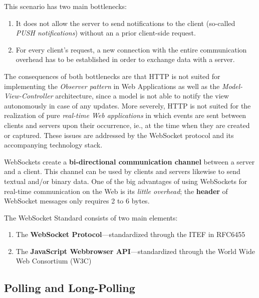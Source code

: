\documentclass[a4paper, justified, notoc]{tufte-handout} %
\begin{document}
This scenario has two main bottlenecks:
\begin{enumerate}
	\item It does not allow the server to send notifications to the client (so-called \emph{PUSH notifications}) without an a prior client-side request.
	\item For every client's request, a new connection with the entire communication overhead has to be established in order to exchange data with a server.
\end{enumerate}

The consequences of both bottlenecks are that HTTP is not suited for implementing the \emph{Observer pattern} in Web Applications as well as the \emph{Model-View-Controller} architecture, since a model is not able to notify the view autonomously in case of any updates. More severely, HTTP is not suited for the realization of pure \emph{real-time Web applications} in which events are sent between clients and servers upon their occurrence, ie., at the time when they are created or captured. 
These issues are addressed by the WebSocket protocol and its accompanying technology stack.

WebSockets create a \textbf{bi-directional communication channel} between a server and a client. This channel can be used by clients and servers likewise to send textual and/or binary data. 
One of the big advantages of using WebSockets for real-time communication on the Web is its \emph{little overhead}; the \textbf{header} of WebSocket messages only requires 2 to 6 bytes. 

The WebSocket Standard consists of two main elements:
\begin{enumerate}
	\item The \textbf{WebSocket Protocol}---standardized through the ITEF in RFC6455
	\item The \textbf{JavaScript Webbrowser API}---standardized through the World Wide Web Consortium (W3C) 
\end{enumerate}




\subsection{Polling and Long-Polling} %
\label{sub:polling}
\end{document}
